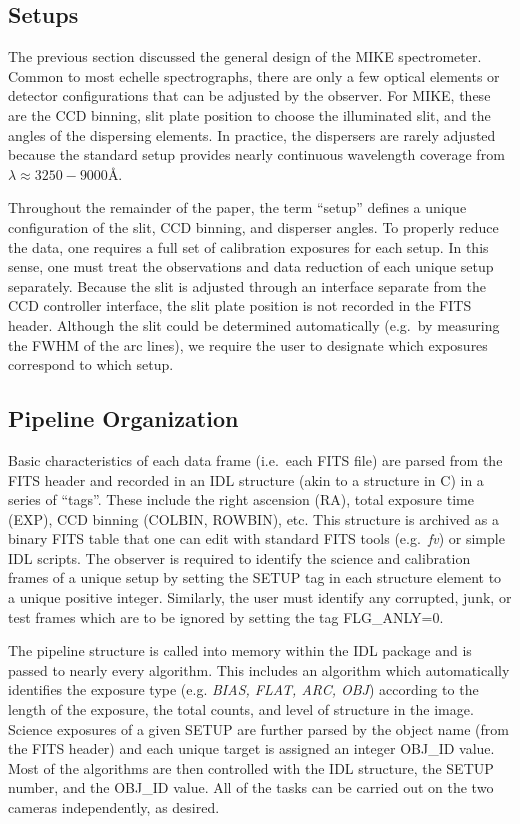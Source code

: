 \documentclass[12pt,preprint]{aastex}
\begin{document}
\subsection{Setups}

The previous section discussed the general design of the
MIKE spectrometer.  Common to most echelle spectrographs,
there are only a few optical elements or detector configurations
that can be adjusted by the observer.  For MIKE, these are the
CCD binning, slit plate position to choose the illuminated slit, 
and the angles of the dispersing elements.
In practice, the dispersers are rarely adjusted
because the standard setup provides nearly continuous wavelength
coverage from $\lambda \approx 3250-9000$\AA.  

Throughout the remainder of the paper, the term ``setup'' defines
a unique configuration of the slit, CCD binning,
and disperser angles.  To properly reduce the data, one requires
a full set of calibration exposures for each setup.  
In this sense, one must treat the observations and data reduction of
each unique setup separately. 
Because the slit is adjusted through an interface separate from the CCD
controller interface, the slit plate position is not
recorded in the FITS header.  Although the slit could be
determined automatically (e.g.\ by measuring the FWHM of the arc lines),
we require the user to designate 
which exposures correspond to which setup.

\subsection{Pipeline Organization}
 
Basic characteristics of each data frame (i.e.\ each FITS file)
are parsed from the FITS header and recorded in an 
IDL structure (akin to a structure in C)
in a series of ``tags''.  These include the right ascension (RA),
total exposure time (EXP), CCD binning 
(COLBIN, ROWBIN), etc.  This structure is archived as a binary FITS table
that one can edit with standard FITS tools (e.g.\ {\it fv})
or simple IDL scripts.  The observer is required to identify the
science and calibration frames of a unique setup by setting the SETUP tag 
in each structure element
to a unique positive integer.
Similarly, the user must identify any corrupted, junk,
or test frames which are to be ignored by setting the tag FLG\_ANLY=0.

The pipeline structure is called into memory within the IDL package
and is passed to nearly every algorithm. 
This includes an algorithm which automatically identifies the 
exposure type (e.g. {\it BIAS, FLAT, ARC, OBJ}) according to the
length of the exposure, the total counts, and
level of structure in the image.
Science exposures of a given SETUP
are further parsed by the object name (from the FITS header) and 
each unique target is assigned an integer OBJ\_ID value. 
Most of the algorithms are then controlled with the
IDL structure, the SETUP number, and the OBJ\_ID value.
All of the tasks can be carried out on the two cameras
independently, as desired.
\end{document}
